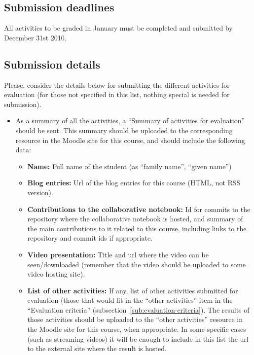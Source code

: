 \documentclass[a4paper]{article}
\begin{document}
\subsection{Submission deadlines}

All activities to be graded in January must be completed and submitted by December 31st 2010.

\subsection{Submission details}

Please, consider the details below for submitting the different activities for evaluation (for those not specified in this list, nothing special is needed for submission).

\begin{itemize}
\item As a summary of all the activities, a ``Summary of activities for evaluation'' should be sent. This summary should be uploaded to the corresponding resource in the Moodle site for this course, and should include the following data:
  \begin{itemize}
  \item \textbf{Name:} Full name of the student (as ``family name'', ``given name'')
  \item \textbf{Blog entries:} Url of the blog entries for this course (HTML, not RSS version).
  \item \textbf{Contributions to the collaborative notebook:} Id for commits to the repository where the collaborative notebook is hosted, and summary of the main contributions to it related to this course, including links to the repository and commit ids if appropriate.
  \item \textbf{Video presentation:} Title and url where the video can be seen/downloaded (remember that the video should be uploaded to some video hosting site).
  \item \textbf{List of other activities:} If any, list of other activities submitted for evaluation (those that would fit in the ``other activities'' item in the ``Evaluation criteria'' (subsection~\ref{sub:evaluation-criteria}). The results of those activities should be uploaded to the ``other activities'' resource in the Moodle site for this course, when appropriate. In some specific cases (such as streaming videos) it will be enough to include in this list the url to the external site where the result is hosted.
  \end{itemize}
\end{itemize}
\end{document}
